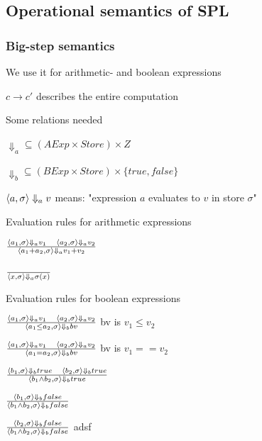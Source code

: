 \subsection{Operational semantics of SPL}

\subsubsection{Big-step semantics}
\enumstart
	\item We use it for arithmetic- and boolean expressions 
	\item $c \rightarrow c'$ describes the entire computation
	\item Some relations needed
	\enumstart
		\item $\Downarrow_a \subseteq (AExp \times Store) \times Z$
		\item $\Downarrow_b \subseteq (BExp \times Store) \times \{true, false\}$
		\item $\langle a, \sigma \rangle \Downarrow_a v$ means: "expression $a$ evaluates to $v$ in store $\sigma$"
	\enumend
	\item Evaluation rules for arithmetic expressions
	\enumstart
		\item $\frac{\langle a_1, \sigma \rangle \Downarrow_a v_1 \ \ \ \langle a_2, \sigma \rangle \Downarrow_a v_2}{\langle a_1 + a_2, \sigma \rangle \Downarrow_a v_1 + v_2}$
		\item $\frac{}{\langle x, \sigma \rangle \Downarrow_a \sigma(x)}$
	\enumend
	\item Evaluation rules for boolean expressions
	\enumstart
		\item $\frac{\langle a_1, \sigma \rangle \Downarrow_a v_1 \ \ \ \langle a_2, \sigma \rangle \Downarrow_a v_2}{\langle a_1 \le a_2, \sigma \rangle \Downarrow_b bv}$ bv is $v_1 \le v_2$
		\item $\frac{\langle a_1, \sigma \rangle \Downarrow_a v_1 \ \ \ \langle a_2, \sigma \rangle \Downarrow_a v_2}{\langle a_1 = a_2, \sigma \rangle \Downarrow_b bv}$ bv is $v_1 == v_2$
		\item $\frac{\langle b_1, \sigma \rangle \Downarrow_b true \ \ \ \langle b_2, \sigma \rangle \Downarrow_b true}{\langle b_1 \land b_2, \sigma \rangle \Downarrow_b true}$
		\item $\frac{\langle b_1, \sigma \rangle \Downarrow_b false}{\langle b_1 \land b_2, \sigma \rangle \Downarrow_b false}$
		\item $\frac{\langle b_2, \sigma \rangle \Downarrow_b false}{\langle b_1 \land b_2, \sigma \rangle \Downarrow_b false}$ adsf
	\enumend
\enumend

